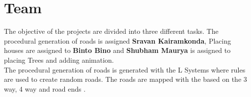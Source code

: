 \chapter{Team}

\large The objective of the projects are divided into three different tasks. The procedural generation of roads is assigned \textbf{Sravan Kairamkonda}, Placing houses are assigned to \textbf{Binto Bino} and  \textbf{Shubham Maurya} is assigned to placing Trees and adding animation.\\[0.2cm]
\large The procedural generation of roads is generated with the L Systems where rules are used to create random roads. The roads are mapped with the based on the 3 way, 4 way and road ends \cite{galin2010procedural}.